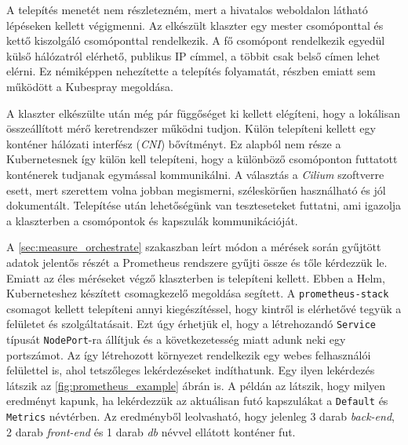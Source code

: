 A telepítés menetét nem részletezném, mert a hivatalos weboldalon látható lépéseken kellett végigmenni. 
Az elkészült klaszter egy mester csomóponttal és kettő kiszolgáló csomóponttal rendelkezik.
A fő csomópont rendelkezik egyedül külső hálózatról elérhető, publikus IP címmel, a többit csak belső címen lehet elérni.
Ez némiképpen nehezítette a telepítés folyamatát, részben emiatt sem működött a Kubespray megoldása. 

A klaszter elkészülte után még pár függőséget ki kellett elégíteni, hogy a lokálisan összeállított mérő keretrendszer működni tudjon.
Külön telepíteni kellett egy konténer hálózati interfész (\textit{CNI}) bővítményt.
Ez alapból nem része a Kubernetesnek így külön kell telepíteni, hogy a különböző csomóponton futtatott konténerek tudjanak egymással kommunikálni.
A választás a \textit{Cilium} szoftverre esett, mert szerettem volna jobban megismerni, széleskörűen használható és jól dokumentált.
Telepítése után lehetőségünk van teszteseteket futtatni, ami igazolja a klaszterben a csomópontok és kapszulák kommunikációját. 

A \ref{sec:measure_orchestrate} szakaszban leírt módon a mérések során gyűjtött adatok jelentős részét a Prometheus rendszere gyűjti össze és tőle kérdezzük le. 
Emiatt az éles méréseket végző klaszterben is telepíteni kellett. 
Ebben a Helm, Kuberneteshez készített csomagkezelő megoldása segített. 
A \verb+prometheus-stack+ csomagot kellett telepíteni annyi kiegészítéssel, hogy kintről is elérhetővé tegyük a felületet és szolgáltatásait. 
Ezt úgy érhetjük el, hogy a létrehozandó \verb+Service+  típusát \verb+NodePort+-ra állítjuk és a következetesség miatt adunk neki egy portszámot. 
Az így létrehozott környezet rendelkezik egy webes felhasználói felülettel is, ahol tetszőleges lekérdezéseket indíthatunk. 
Egy ilyen lekérdezés látszik az \ref{fig:prometheus_example} ábrán is. 
A példán az látszik, hogy milyen eredményt kapunk, ha lekérdezzük az aktuálisan futó kapszulákat a \verb+Default+ és \verb+Metrics+ névtérben. 
Az eredményből leolvasható, hogy jelenleg 3 darab \textit{back-end}, 2 darab \textit{front-end} és 1 darab \textit{db} névvel ellátott konténer fut. \\


